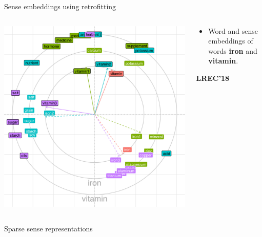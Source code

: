 \documentclass[usenames,dvipsnames]{beamer}
\begin{document}
\begin{frame}{Sense embeddings using retrofitting}
\vspace{-1em}
\begin{columns}
\begin{column}{0.55\textwidth}
\includegraphics[height=0.68\textheight]{bullseye}
\end{column}

\begin{column}{.45\textwidth}
{ \footnotesize

\begin{itemize}

\item Word and sense embeddings of words \textbf{iron} and  \textbf{vitamin}.

\end{itemize}

\textbf{LREC'18}~\cite{remus:2018}

}
\end{column}
\end{columns}

\end{frame}


\begin{frame}{Sparse sense representations}
	
\end{frame}
\end{document}
